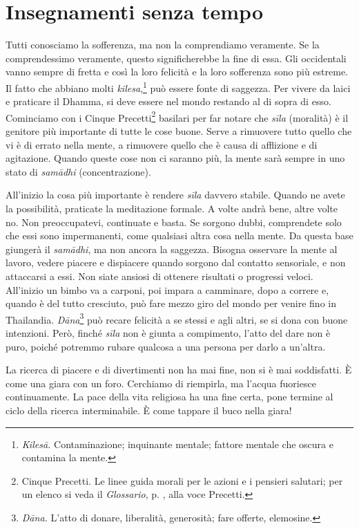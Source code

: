 \chapter{Insegnamenti senza tempo}

Tutti conosciamo la sofferenza, ma non la comprendiamo veramente. Se la
comprendessimo veramente, questo significherebbe la fine di essa. Gli
occidentali vanno sempre di fretta e così la loro felicità e la loro
sofferenza sono più estreme. Il fatto che abbiano molti
\emph{kilesa},\footnote{\emph{Kilesā.} Contaminazione; inquinante
  mentale; fattore mentale che oscura e contamina la mente.} può essere
fonte di saggezza. Per vivere da laici e praticare il Dhamma, si deve
essere nel mondo restando al di sopra di esso. Cominciamo con i Cinque
Precetti\footnote{Cinque Precetti. Le linee guida morali per le azioni e
  i pensieri salutari; per un elenco si veda il \emph{Glossario}, p. \pageref{glossary-precetti}, alla
  voce Precetti.} basilari per far notare che \emph{sīla} (moralità)
è il genitore più importante di tutte le
cose buone. Serve a rimuovere tutto quello che vi è di errato nella
mente, a rimuovere quello che è causa di afflizione e di agitazione.
Quando queste cose non ci saranno più, la mente sarà sempre in uno stato
di \emph{samādhi} (concentrazione).

All'inizio la cosa più importante è rendere \emph{sīla} davvero stabile.
Quando ne avete la possibilità, praticate la meditazione formale. A
volte andrà bene, altre volte no. Non preoccupatevi, continuate e basta.
Se sorgono dubbi, comprendete solo che essi sono impermanenti, come
qualsiasi altra cosa nella mente. Da questa base giungerà il
\emph{samādhi}, ma non ancora la saggezza. Bisogna osservare la mente al
lavoro, vedere piacere e dispiacere quando sorgono dal contatto
sensoriale, e non attaccarsi a essi. Non siate ansiosi di ottenere
risultati o progressi veloci. All'inizio un bimbo va a carponi, poi
impara a camminare, dopo a correre e, quando è del tutto cresciuto, può
fare mezzo giro del mondo per venire fino in Thailandia.
\emph{Dāna}\footnote{\emph{Dāna.} L'atto di donare, liberalità,
  generosità; fare offerte, elemosine.} può recare felicità a se stessi
e agli altri, se si dona con buone intenzioni. Però, finché \emph{sīla}
non è giunta a compimento, l'atto del dare non è puro, poiché potremmo
rubare qualcosa a una persona per darlo a un'altra.

La ricerca di piacere e di divertimenti non ha mai fine, non si è mai
soddisfatti. È come una giara con un foro. Cerchiamo di riempirla, ma
l'acqua fuoriesce continuamente. La pace della vita religiosa ha una
fine certa, pone termine al ciclo della ricerca interminabile. È come
tappare il buco nella giara!

